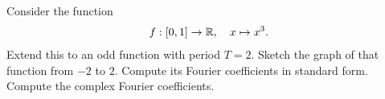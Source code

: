 \documentclass[11pt]{article}
\begin{document}
\begin{exercise}
    Consider the function 
    \begin{align*}
        f : [0,1] \to \mathbb{R}, \quad x \mapsto x^{3}.
    \end{align*}
    Extend this to an odd function with period $T = 2$. Sketch the graph of that function from $-2$ to $2$.
    Compute its Fourier coefficients in standard form. Compute the complex Fourier coefficients.
\end{exercise}
\end{document}
